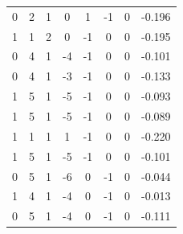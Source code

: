 \documentclass[a4paper, 12pt]{article}
\begin{document}
\begin{table}[H]
\begin{tabular}{@{}cccccccc@{}}
    0                      & 2                      & 1                      & 0                      & 1                 & -1                & 0                 & -0.196              \\
    1                      & 1                      & 2                      & 0                      & -1                & 0                 & 0                 & -0.195              \\
    0                      & 4                      & 1                      & -4                     & -1                & 0                 & 0                 & -0.101              \\
    0                      & 4                      & 1                      & -3                     & -1                & 0                 & 0                 & -0.133              \\
    1                      & 5                      & 1                      & -5                     & -1                & 0                 & 0                 & -0.093              \\
    1                      & 5                      & 1                      & -5                     & -1                & 0                 & 0                 & -0.089              \\
    1                      & 1                      & 1                      & 1                      & -1                & 0                 & 0                 & -0.220              \\
    1                      & 5                      & 1                      & -5                     & -1                & 0                 & 0                 & -0.101              \\
    0                      & 5                      & 1                      & -6                     & 0                 & -1                & 0                 & -0.044              \\
    1                      & 4                      & 1                      & -4                     & 0                 & -1                & 0                 & -0.013              \\
    0                      & 5                      & 1                      & -4                     & 0                 & -1                & 0                 & -0.111              \\ \bottomrule
    \end{tabular}
    \end{table}
\end{document}
